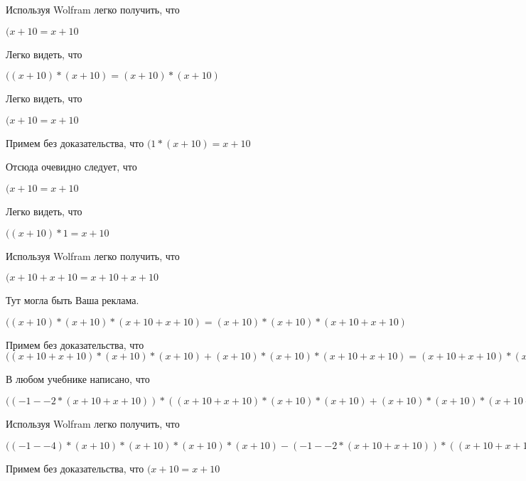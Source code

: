 \documentclass[12pt,a4paper,fleqn]{article}
\theoremstyle{definition}
\begin{document}
Используя Wolfram легко получить, что

$( x  +  10  =  x  +  10 $

Легко видеть, что

$(( x  +  10 ) * ( x  +  10 ) = ( x  +  10 ) * ( x  +  10 )$

Легко видеть, что

$( x  +  10  =  x  +  10 $

Примем без доказательства, что
$( 1  * ( x  +  10 ) =  x  +  10 $

Отсюда очевидно следует, что

$( x  +  10  =  x  +  10 $

Легко видеть, что

$(( x  +  10 ) *  1  =  x  +  10 $

Используя Wolfram легко получить, что

$( x  +  10  +  x  +  10  =  x  +  10  +  x  +  10 $

Тут могла быть Ваша реклама.

$(( x  +  10 ) * ( x  +  10 ) * ( x  +  10  +  x  +  10 ) = ( x  +  10 ) * ( x  +  10 ) * ( x  +  10  +  x  +  10 )$

Примем без доказательства, что
$(( x  +  10  +  x  +  10 ) * ( x  +  10 ) * ( x  +  10 ) + ( x  +  10 ) * ( x  +  10 ) * ( x  +  10  +  x  +  10 ) = ( x  +  10  +  x  +  10 ) * ( x  +  10 ) * ( x  +  10 ) + ( x  +  10 ) * ( x  +  10 ) * ( x  +  10  +  x  +  10 )$

В любом учебнике написано, что

$(( -1  -  -2  * ( x  +  10  +  x  +  10 )) * (( x  +  10  +  x  +  10 ) * ( x  +  10 ) * ( x  +  10 ) + ( x  +  10 ) * ( x  +  10 ) * ( x  +  10  +  x  +  10 )) = ( -1  -  -2  * ( x  +  10  +  x  +  10 )) * (( x  +  10  +  x  +  10 ) * ( x  +  10 ) * ( x  +  10 ) + ( x  +  10 ) * ( x  +  10 ) * ( x  +  10  +  x  +  10 ))$

Используя Wolfram легко получить, что

$(( -1  -  -4 ) * ( x  +  10 ) * ( x  +  10 ) * ( x  +  10 ) * ( x  +  10 ) - ( -1  -  -2  * ( x  +  10  +  x  +  10 )) * (( x  +  10  +  x  +  10 ) * ( x  +  10 ) * ( x  +  10 ) + ( x  +  10 ) * ( x  +  10 ) * ( x  +  10  +  x  +  10 )) = ( -1  -  -4 ) * ( x  +  10 ) * ( x  +  10 ) * ( x  +  10 ) * ( x  +  10 ) - ( -1  -  -2  * ( x  +  10  +  x  +  10 )) * (( x  +  10  +  x  +  10 ) * ( x  +  10 ) * ( x  +  10 ) + ( x  +  10 ) * ( x  +  10 ) * ( x  +  10  +  x  +  10 ))$

Примем без доказательства, что
$( x  +  10  =  x  +  10 $
\end{document}
